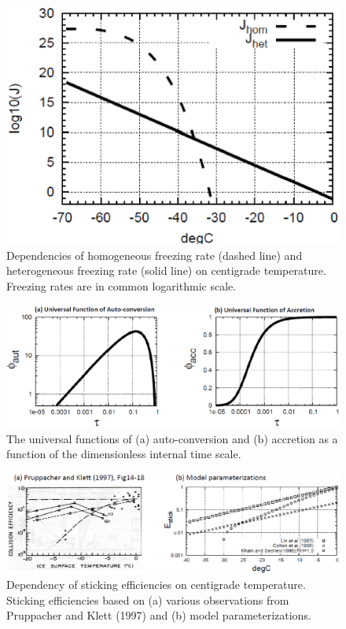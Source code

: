 \begin{figure}[htbp]
\begin{center}
\includegraphics[scale=0.5]{./figure/homo_frz_rate.eps}
\end{center}
\caption{Dependencies of homogeneous freezing rate (dashed line) and heterogeneous freezing rate (solid line) on centigrade temperature. Freezing rates are in common logarithmic scale.}
\label{figsn2-20}
\end{figure}

\begin{figure}[htbp]
\begin{center}
\includegraphics[scale=0.25]{./figure/univ_function.eps}
\end{center}
\caption{The universal functions of (a) auto-conversion and (b) accretion as a function of the dimensionless internal time scale.}
\label{figsn2-21}
\end{figure}

\begin{figure}[htbp]
\begin{center}
\includegraphics[scale=0.25]{./figure/stic_effic.eps}
\end{center}
\caption{Dependency of sticking efficiencies on centigrade temperature. Sticking efficiencies based on (a) various observations from Pruppacher and Klett (1997) and (b) model parameterizations.}
\label{figsn2-22}
\end{figure}

